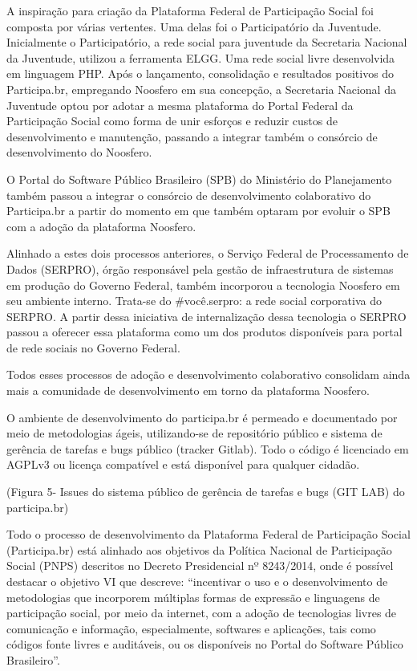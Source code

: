 \documentclass{article}
\begin{document}
A inspiração para criação da Plataforma Federal de Participação Social foi
composta por várias vertentes. Uma delas foi o Participatório da Juventude.
Inicialmente o Participatório, a rede social para juventude da Secretaria
Nacional da Juventude, utilizou a ferramenta ELGG. Uma rede social livre
desenvolvida em linguagem PHP. Após o lançamento, consolidação e resultados
positivos do Participa.br, empregando Noosfero em sua concepção, a Secretaria
Nacional da Juventude optou por adotar a mesma plataforma do Portal Federal da
Participação Social como forma de unir esforços e reduzir custos de
desenvolvimento e manutenção, passando a integrar também o consórcio de
desenvolvimento do Noosfero. 

O Portal do Software Público Brasileiro (SPB) do Ministério do Planejamento
também passou a integrar o consórcio de desenvolvimento colaborativo do
Participa.br a partir do momento em que também optaram por evoluir o SPB com a
adoção da plataforma Noosfero.

Alinhado a estes dois processos anteriores, o Serviço Federal de Processamento
de Dados (SERPRO), órgão responsável pela gestão de infraestrutura de sistemas
em produção do Governo Federal, também incorporou a tecnologia Noosfero em seu
ambiente interno. Trata-se do \#você.serpro: a rede social corporativa do
SERPRO. A partir dessa iniciativa de internalização dessa tecnologia o SERPRO
passou a oferecer essa plataforma como um dos produtos disponíveis para portal
de rede sociais no Governo Federal.

Todos esses processos de adoção e desenvolvimento colaborativo consolidam ainda
mais a comunidade de desenvolvimento em torno da plataforma Noosfero.

O ambiente de desenvolvimento do participa.br é permeado e documentado por meio
de metodologias ágeis, utilizando-se de repositório público e sistema de
gerência de tarefas e bugs público (tracker Gitlab). Todo o código é
licenciado em AGPLv3 ou licença compatível e está disponível para qualquer
cidadão.

(Figura 5- Issues do sistema público de gerência de tarefas e bugs (GIT LAB) do participa.br)

Todo o processo de desenvolvimento da Plataforma Federal de Participação Social
(Participa.br) está alinhado aos objetivos da Política Nacional de Participação
Social (PNPS) descritos no Decreto Presidencial nº 8243/2014, onde é possível
destacar o objetivo VI que descreve: ``incentivar o uso e o desenvolvimento de
metodologias que incorporem múltiplas formas de expressão e linguagens de
participação social, por meio da internet, com a adoção de tecnologias livres
de comunicação e informação, especialmente, softwares e aplicações, tais como
códigos fonte livres e auditáveis, ou os disponíveis no Portal do Software
Público Brasileiro''.
\end{document}
